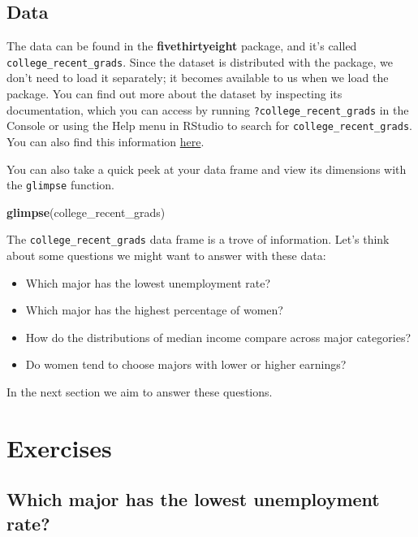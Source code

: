 \documentclass[
]{article}
\newenvironment{Shaded}{\begin{snugshade}}{\end{snugshade}}
\newcommand{\FunctionTok}[1]{\textcolor[rgb]{0.13,0.29,0.53}{\textbf{#1}}}
\newcommand{\NormalTok}[1]{#1}
\providecommand{\tightlist}{%
  \setlength{\itemsep}{0pt}\setlength{\parskip}{0pt}}
\begin{document}
\subsection{Data}\label{data}

The data can be found in the \textbf{fivethirtyeight} package, and it's
called \texttt{college\_recent\_grads}. Since the dataset is distributed
with the package, we don't need to load it separately; it becomes
available to us when we load the package. You can find out more about
the dataset by inspecting its documentation, which you can access by
running \texttt{?college\_recent\_grads} in the Console or using the
Help menu in RStudio to search for \texttt{college\_recent\_grads}. You
can also find this information
\href{https://fivethirtyeight-r.netlify.app/reference/college_recent_grads.html}{here}.

You can also take a quick peek at your data frame and view its
dimensions with the \texttt{glimpse} function.

\begin{Shaded}
\begin{Highlighting}[]
\FunctionTok{glimpse}\NormalTok{(college\_recent\_grads)}
\end{Highlighting}
\end{Shaded}

The \texttt{college\_recent\_grads} data frame is a trove of
information. Let's think about some questions we might want to answer
with these data:

\begin{itemize}
\tightlist
\item
  Which major has the lowest unemployment rate?
\item
  Which major has the highest percentage of women?
\item
  How do the distributions of median income compare across major
  categories?
\item
  Do women tend to choose majors with lower or higher earnings?
\end{itemize}

In the next section we aim to answer these questions.

\section{Exercises}\label{exercises}

\subsection{Which major has the lowest unemployment
rate?}\label{which-major-has-the-lowest-unemployment-rate}
\end{document}
